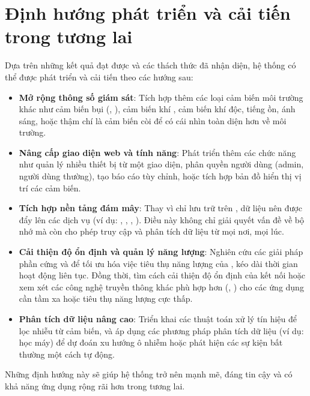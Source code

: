 \section{Định hướng phát triển và cải tiến trong tương lai}
Dựa trên những kết quả đạt được và các thách thức đã nhận diện, hệ thống có thể được phát triển và cải tiến theo các hướng sau:
\begin{itemize}
	\item \textbf{Mở rộng thông số giám sát}: Tích hợp thêm các loại cảm biến môi trường khác như cảm biến bụi (, ), cảm biến khí , cảm biến khí độc, tiếng ồn, ánh sáng, hoặc thậm chí là cảm biến còi để có cái nhìn toàn diện hơn về môi trường.
	\item \textbf{Nâng cấp giao diện web và tính năng}: Phát triển thêm các chức năng như quản lý nhiều thiết bị từ một giao diện, phân quyền người dùng (admin, người dùng thường), tạo báo cáo tùy chỉnh, hoặc tích hợp bản đồ hiển thị vị trí các cảm biến.
	\item \textbf{Tích hợp nền tảng đám mây}: Thay vì chỉ lưu trữ trên , dữ liệu nên được đẩy lên các dịch vụ   (ví dụ: , , , ). Điều này không chỉ giải quyết vấn đề về bộ nhớ mà còn cho phép truy cập và phân tích dữ liệu từ mọi nơi, mọi lúc.
	\item \textbf{Cải thiện độ ổn định và quản lý năng lượng}: Nghiên cứu các giải pháp phần cứng và  để tối ưu hóa việc tiêu thụ năng lượng của , kéo dài thời gian hoạt động liên tục. Đồng thời, tìm cách cải thiện độ ổn định của kết nối  hoặc xem xét các công nghệ truyền thông khác phù hợp hơn (, ) cho các ứng dụng cần tầm xa hoặc tiêu thụ năng lượng cực thấp.
	\item \textbf{Phân tích dữ liệu nâng cao}: Triển khai các thuật toán xử lý tín hiệu để lọc nhiễu từ cảm biến, và áp dụng các phương pháp phân tích dữ liệu (ví dụ: học máy) để dự đoán xu hướng ô nhiễm hoặc phát hiện các sự kiện bất thường một cách tự động.
\end{itemize}
Những định hướng này sẽ giúp hệ thống trở nên mạnh mẽ, đáng tin cậy và có khả năng ứng dụng rộng rãi hơn trong tương lai.